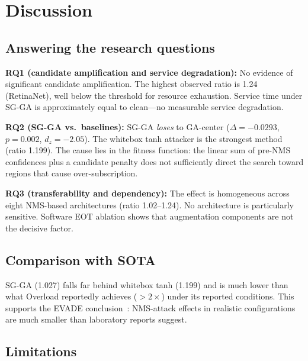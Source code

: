 \documentclass[a4paper,fleqn]{cas-dc}
\begin{document}
\section{Discussion}

\subsection{Answering the research questions}

\textbf{RQ1 (candidate amplification and service degradation):} No evidence of significant candidate amplification. The highest observed ratio is 1.24 (RetinaNet), well below the threshold for resource exhaustion. Service time under SG-GA is approximately equal to clean---no measurable service degradation.

\textbf{RQ2 (SG-GA vs.\ baselines):} SG-GA \emph{loses} to GA-center ($\Delta = -0.0293$, $p = 0.002$, $d_z = -2.05$). The whitebox tanh attacker is the strongest method (ratio 1.199). The cause lies in the fitness function: the linear sum of pre-NMS confidences plus a candidate penalty does not sufficiently direct the search toward regions that cause over-subscription.

\textbf{RQ3 (transferability and dependency):} The effect is homogeneous across eight NMS-based architectures (ratio 1.02--1.24). No architecture is particularly sensitive. Software EOT ablation shows that augmentation components are not the decisive factor.

\subsection{Comparison with SOTA}

SG-GA (1.027) falls far behind whitebox tanh (1.199) and is much lower than what Overload reportedly achieves ($>2\times$) under its reported conditions. This supports the EVADE conclusion~\cite{evade2025}: NMS-attack effects in realistic configurations are much smaller than laboratory reports suggest.

\subsection{Limitations}
\end{document}
